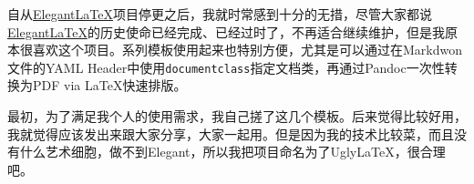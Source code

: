 自从\href{https://github.com/ElegantLaTeX/}{Elegant\LaTeX}项目停更之后，我就时常感到十分的无措，尽管大家都说\href{https://github.com/ElegantLaTeX/}{Elegant\LaTeX}的历史使命已经完成、已经过时了，不再适合继续维护，但是我原本很喜欢这个项目。系列模板使用起来也特别方便，尤其是可以通过在Markdwon文件的YAML Header中使用\texttt{documentclass}指定文档类，再通过Pandoc一次性转换为PDF via \LaTeX{}快速排版。

最初，为了满足我个人的使用需求，我自己搓了这几个模板。后来觉得比较好用，我就觉得应该发出来跟大家分享，大家一起用。但是因为我的技术比较菜，而且没有什么艺术细胞，做不到Elegant，所以我把项目命名为了Ugly\LaTeX{}，很合理吧。